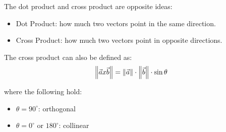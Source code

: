 The dot product and cross product are opposite ideas:
\begin{itemize}
	\item Dot Product: how much two vectors point in the same direction.
	\item Cross Product: how much two vectors point in opposite directions.
\end{itemize}

The cross product can also be defined as:
\begin{equation}
	\left\Vert \vec{a} x \vec{b} \right\Vert = \left\Vert \vec{a} \right\Vert \cdot \left\Vert \vec{b} \right\Vert \cdot \sin \theta
\end{equation}

where the following hold:
\begin{itemize}
	\item $\theta = 90^\circ$: orthogonal
	\item $\theta = 0^\circ$ or $180^\circ$: collinear 
\end{itemize}